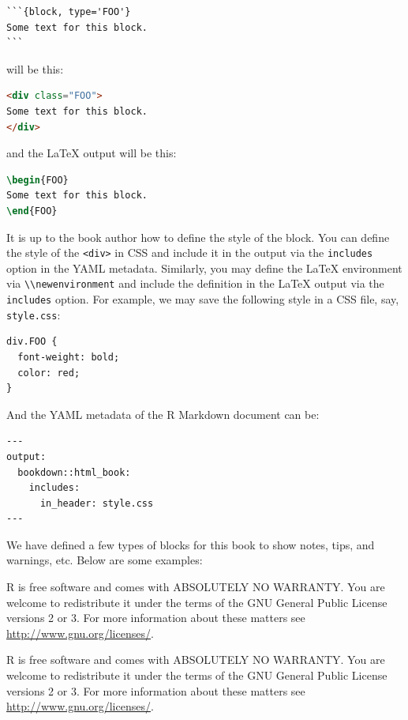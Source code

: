 \documentclass[doctor,openright,twoside]{sjtuthesis}
\newcommand{\passthrough}[1]{#1}
\theoremstyle{plain}
\theoremstyle{definition}
\theoremstyle{remark}
\theoremstyle{ocrenumbox}
\theoremstyle{plain}
\let\BeginKnitrBlock\begin \let\EndKnitrBlock\end
\begin{document}
\begin{lstlisting}
```{block, type='FOO'}
Some text for this block.
```
\end{lstlisting}

will be this:

\begin{lstlisting}[language=HTML]
<div class="FOO">
Some text for this block.
</div>
\end{lstlisting}

and the LaTeX output will be this:

\begin{lstlisting}[language=TeX]
\begin{FOO}
Some text for this block.
\end{FOO}
\end{lstlisting}

It is up to the book author how to define the style of the block. You can define the style of the \passthrough{\lstinline!<div>!} in CSS and include it in the output via the \passthrough{\lstinline!includes!} option in the YAML metadata. Similarly, you may define the LaTeX environment via \passthrough{\lstinline!\\newenvironment!} and include the definition in the LaTeX output via the \passthrough{\lstinline!includes!} option. For example, we may save the following style in a CSS file, say, \passthrough{\lstinline!style.css!}:

\begin{lstlisting}
div.FOO {
  font-weight: bold;
  color: red;
}
\end{lstlisting}

And the YAML metadata of the R Markdown document can be:

\begin{lstlisting}
---
output:
  bookdown::html_book:
    includes:
      in_header: style.css
---
\end{lstlisting}

We have defined a few types of blocks for this book to show notes, tips, and warnings, etc. Below are some examples:

\BeginKnitrBlock{rmdnote}
R is free software and comes with ABSOLUTELY NO WARRANTY.
You are welcome to redistribute it under the terms of the
GNU General Public License versions 2 or 3.
For more information about these matters see
\url{http://www.gnu.org/licenses/}.
\EndKnitrBlock{rmdnote}

\BeginKnitrBlock{rmdcaution}
R is free software and comes with ABSOLUTELY NO WARRANTY.
You are welcome to redistribute it under the terms of the
GNU General Public License versions 2 or 3.
For more information about these matters see
\url{http://www.gnu.org/licenses/}.
\EndKnitrBlock{rmdcaution}
\end{document}
